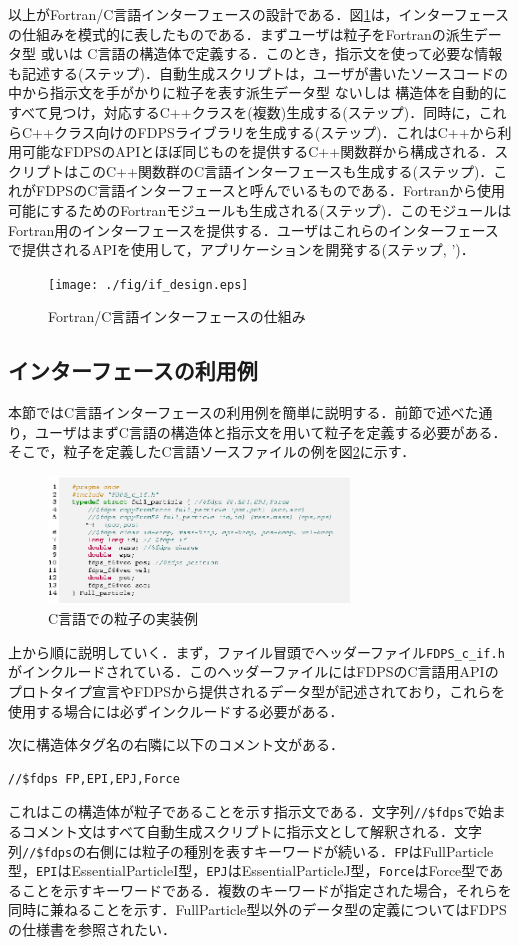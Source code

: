 以上がFortran/C言語インターフェースの設計である．図\ref{fig:if_design}は，インターフェースの仕組みを模式的に表したものである．まずユーザは粒子をFortranの派生データ型 或いは C言語の構造体で定義する．このとき，指示文を使って必要な情報も記述する(ステップ)．自動生成スクリプトは，ユーザが書いたソースコードの中から指示文を手がかりに粒子を表す派生データ型 ないしは 構造体を自動的にすべて見つけ，対応するC++クラスを(複数)生成する(ステップ)．同時に，これらC++クラス向けのFDPSライブラリを生成する(ステップ)．これはC++から利用可能なFDPSのAPIとほぼ同じものを提供するC++関数群から構成される．スクリプトはこのC++関数群のC言語インターフェースも生成する(ステップ)．これがFDPSのC言語インターフェースと呼んでいるものである．Fortranから使用可能にするためのFortranモジュールも生成される(ステップ)．このモジュールはFortran用のインターフェースを提供する．ユーザはこれらのインターフェースで提供されるAPIを使用して，アプリケーションを開発する(ステップ, ')．
\begin{figure}
\centering
\texttt{[image: ./fig/if\_design.eps]}
\caption{Fortran/C言語インターフェースの仕組み}
\label{fig:if_design}
\end{figure}

\subsection{インターフェースの利用例}
本節ではC言語インターフェースの利用例を簡単に説明する．前節で述べた通り，ユーザはまずC言語の構造体と指示文を用いて粒子を定義する必要がある．そこで，粒子を定義したC言語ソースファイルの例を図\ref{fig:src_fp_in_c}に示す．
\begin{figure}
\centering
\includegraphics[width=8cm]{./fig/src_fp_in_c.eps}
\caption{C言語での粒子の実装例}
\label{fig:src_fp_in_c}
\end{figure}
上から順に説明していく．まず，ファイル冒頭でヘッダーファイル\texttt{FDPS\_c\_if.h}がインクルードされている．このヘッダーファイルにはFDPSのC言語用APIのプロトタイプ宣言やFDPSから提供されるデータ型が記述されており，これらを使用する場合には必ずインクルードする必要がある．

次に構造体タグ名の右隣に以下のコメント文がある．
\begin{lstlisting}
//$fdps FP,EPI,EPJ,Force
\end{lstlisting}
これはこの構造体が粒子であることを示す指示文である．文字列\texttt{//\$fdps}で始まるコメント文はすべて自動生成スクリプトに指示文として解釈される．文字列\texttt{//\$fdps}の右側には粒子の種別を表すキーワードが続いる．\texttt{FP}はFullParticle型，\texttt{EPI}はEssentialParticleI型，\texttt{EPJ}はEssentialParticleJ型，\texttt{Force}はForce型であることを示すキーワードである．複数のキーワードが指定された場合，それらを同時に兼ねることを示す．FullParticle型以外のデータ型の定義についてはFDPSの仕様書を参照されたい．

